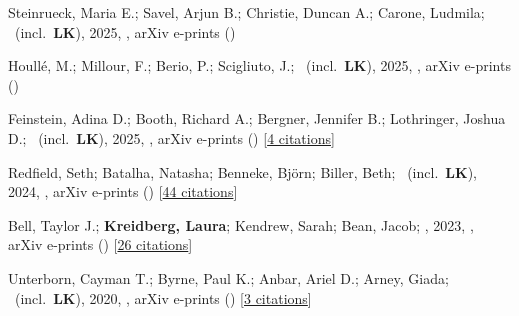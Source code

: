 \item[{\color{numcolor}\scriptsize15}] Steinrueck, Maria E.; Savel, Arjun B.; Christie, Duncan A.; Carone, Ludmila; \etal\ (incl.\ \textbf{LK}), 2025, , arXiv e-prints ()

\item[{\color{numcolor}\scriptsize14}] Houll{\'e}, M.; Millour, F.; Berio, P.; Scigliuto, J.; \etal\ (incl.\ \textbf{LK}), 2025, , arXiv e-prints ()

\item[{\color{numcolor}\scriptsize13}] Feinstein, Adina D.; Booth, Richard A.; Bergner, Jennifer B.; Lothringer, Joshua D.; \etal\ (incl.\ \textbf{LK}), 2025, , arXiv e-prints () [\href{https://ui.adsabs.harvard.edu/abs/2025arXiv250600669F}{4 citations}]

\item[{\color{numcolor}\scriptsize12}] Redfield, Seth; Batalha, Natasha; Benneke, Bj{\"o}rn; Biller, Beth; \etal\ (incl.\ \textbf{LK}), 2024, , arXiv e-prints () [\href{https://ui.adsabs.harvard.edu/abs/2024arXiv240402932R}{44 citations}]

\item[{\color{numcolor}\scriptsize11}] Bell, Taylor J.; \textbf{Kreidberg, Laura}; Kendrew, Sarah; Bean, Jacob; \etal, 2023, , arXiv e-prints () [\href{https://ui.adsabs.harvard.edu/abs/2023arXiv230106350B}{26 citations}]

\item[{\color{numcolor}\scriptsize10}] Unterborn, Cayman T.; Byrne, Paul K.; Anbar, Ariel D.; Arney, Giada; \etal\ (incl.\ \textbf{LK}), 2020, , arXiv e-prints () [\href{https://ui.adsabs.harvard.edu/abs/2020arXiv200708665U}{3 citations}]

